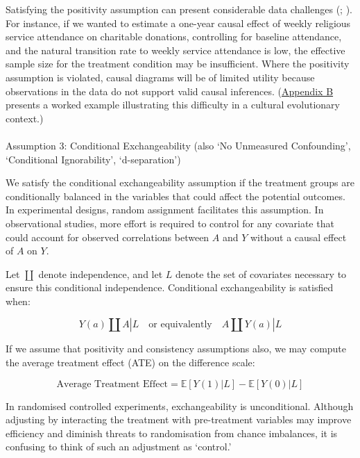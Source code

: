 \documentclass[
  single column]{article}
\makeatletter
\let\oldparagraph\paragraph
\renewcommand{\paragraph}{
    \@ifstar
      \xxxParagraphStar
      \xxxParagraphNoStar
  }
\newcommand{\xxxParagraphStar}[1]{\oldparagraph*{#1}\mbox{}}
\newcommand{\xxxParagraphNoStar}[1]{\oldparagraph{#1}\mbox{}}
\makeatother
\begin{document}
Satisfying the positivity assumption can present considerable data
challenges (;
). For instance, if
we wanted to estimate a one-year causal effect of weekly religious
service attendance on charitable donations, controlling for baseline
attendance, and the natural transition rate to weekly service attendance
is low, the effective sample size for the treatment condition may be
insufficient. Where the positivity assumption is violated, causal
diagrams will be of limited utility because observations in the data do
not support valid causal inferences. (\hyperref[id-app-b]{Appendix B}
presents a worked example illustrating this difficulty in a cultural
evolutionary context.)

\paragraph{Assumption 3: Conditional Exchangeability (also `No
Unmeasured Confounding', `Conditional Ignorability',
`d-separation')}\label{assumption-3-conditional-exchangeability-also-no-unmeasured-confounding-conditional-ignorability-d-separation}

We satisfy the conditional exchangeability assumption if the treatment
groups are conditionally balanced in the variables that could affect the
potential outcomes. In experimental designs, random assignment
facilitates this assumption. In observational studies, more effort is
required to control for any covariate that could account for observed
correlations between \(A\) and \(Y\) without a causal effect of \(A\) on
\(Y\).

Let \(\coprod\) denote independence, and let \(L\) denote the set of
covariates necessary to ensure this conditional independence.
Conditional exchangeability is satisfied when:

\[
Y(a) \coprod A | L \quad \text{or equivalently} \quad A \coprod Y(a) | L
\]

If we assume that positivity and consistency assumptions also, we may
compute the average treatment effect (ATE) on the difference scale:

\[
\text{Average Treatment Effect} = \mathbb{E}[Y(1) | L] - \mathbb{E}[Y(0) | L]
\]

In randomised controlled experiments, exchangeability is unconditional.
Although adjusting by interacting the treatment with pre-treatment
variables may improve efficiency and diminish threats to randomisation
from chance imbalances, it is confusing to think of such an adjustment
as `control.'
\end{document}
